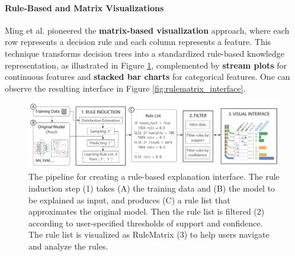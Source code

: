 \paragraph{Rule-Based and Matrix Visualizations}

Ming et al. \cite{ming2019rulematrix} pioneered the \textbf{matrix-based visualization} approach, where each row represents a decision rule and each column represents a feature. This technique transforms decision trees into a standardized rule-based knowledge representation, as illustrated in Figure \ref{fig:rulematrix_pipeline}, complemented by \textbf{stream plots} for continuous features and \textbf{stacked bar charts} for categorical features.
One can observe the resulting interface in Figure \ref{fig:rulematrix_interface}.

\begin{figure}[!htb]
    \centering
    \includegraphics[width=0.9\linewidth]{images/rulematrix1.png}
    \caption{The pipeline for creating a rule-based explanation interface. The rule induction step (1) takes (A) the training data and (B) the model to be
explained as input, and produces (C) a rule list that approximates the original model. Then the rule list is filtered (2) according to user-specified
thresholds of support and confidence. The rule list is visualized as RuleMatrix (3) to help users navigate and analyze the rules.}
    \label{fig:rulematrix_pipeline}
\end{figure}

